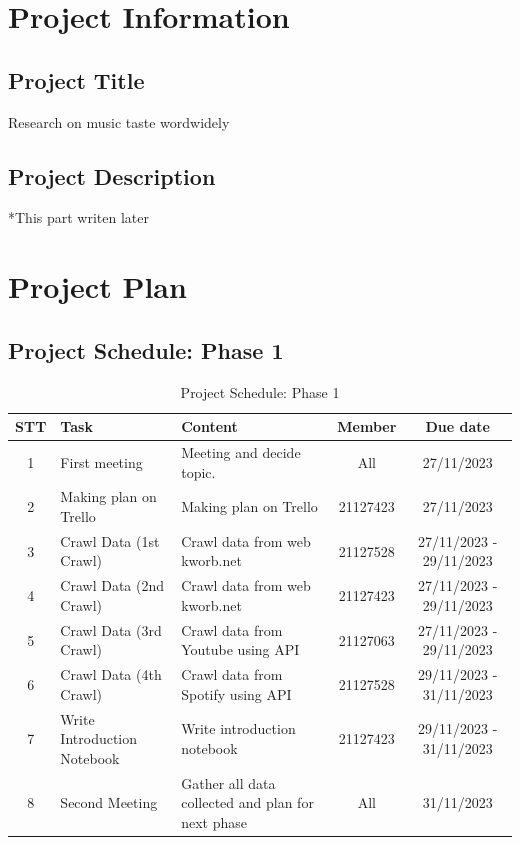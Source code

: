 \documentclass[13pt]{article}
\begin{document}
\section{Project Information}

\subsection{Project Title}
Research on music taste wordwidely
\subsection{Project Description}
*This part writen later


\newpage

\section{Project Plan}

\subsection{Project Schedule: Phase 1}
\begin{table}[h]
    \centering
    \begin{tabular}{|c|p{4cm}|p{5cm}|c|c|}
    \hline
       \textbf{STT} & \textbf{Task} & \textbf{Content} & \textbf{Member} & \textbf{Due date}\\
    \hline
        1 & First meeting & Meeting and decide topic. & All & 27/11/2023\\
    \hline
        2 & Making plan on Trello & Making plan on Trello & 21127423 & 27/11/2023\\
    \hline
        3 & Crawl Data (1st Crawl) & Crawl data from web kworb.net & 21127528 & 27/11/2023 - 29/11/2023\\
    \hline
        4 & Crawl Data (2nd Crawl) & Crawl data from web kworb.net & 21127423 & 27/11/2023 - 29/11/2023\\
    \hline
        5 & Crawl Data (3rd Crawl) & Crawl data from Youtube using API & 21127063 & 27/11/2023 - 29/11/2023\\
    \hline
        6 & Crawl Data (4th Crawl) & Crawl data from Spotify using API & 21127528 & 29/11/2023 - 31/11/2023\\
    \hline
        7 & Write Introduction Notebook & Write introduction notebook & 21127423 & 29/11/2023 - 31/11/2023\\
    \hline
        8 & Second Meeting & Gather all data collected and plan for next phase & All & 31/11/2023\\
    \hline
    \end{tabular}
    \caption{Project Schedule: Phase 1}
    \label{tab:mytable}
\end{table}
\end{document}
